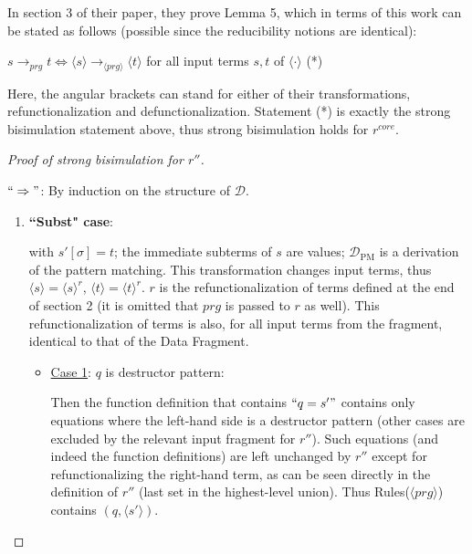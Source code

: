 In section 3 of their paper, they prove Lemma 5, which in terms of this work can be stated as follows (possible since the reducibility notions are identical):

$s \longrightarrow_{prg} t \iff \langle s \rangle \longrightarrow_{\langle prg \rangle} \langle t \rangle$ for all input terms $s,t$ of $\langle \cdot \rangle$ (*)

Here, the angular brackets can stand for either of their transformations, refunctionalization and defunctionalization. Statement (*) is exactly the strong bisimulation statement above, thus strong bisimulation holds for $r^{core}$.

\begin{proof}[Proof of strong bisimulation for $r''$] ~

$`` \Rightarrow "$: By induction on the structure of $\mathcal{D}$.

\begin{enumerate}
\item \textbf{``Subst" case}:

\begin{prooftree}
\end{prooftree}

with $s'[\sigma] = t$; the immediate subterms of $s$ are values; $\mathcal{D}_{\textrm{PM}}$ is a derivation of the pattern matching. This transformation changes input terms, thus $\langle s \rangle = \langle s \rangle^r$, $\langle t \rangle = \langle t \rangle^r$. $r$ is the refunctionalization of terms defined at the end of section 2 (it is omitted that $prg$ is passed to $r$ as well). This refunctionalization of terms is also, for all input terms from the fragment, identical to that of the Data Fragment.

\begin{itemize}

\item \underline{Case 1}: $q$ is destructor pattern:

Then the function definition that contains $`` q = s' "$ contains only equations where the left-hand side is a destructor pattern (other cases are excluded by the relevant input fragment for $r''$). Such equations (and indeed the function definitions) are left unchanged by $r''$ except for refunctionalizing the right-hand term, as can be seen directly in the definition of $r''$ (last set in the highest-level union). Thus Rules($\langle prg \rangle$) contains $(q, \langle s' \rangle)$.


\end{itemize}
\end{enumerate}
\end{proof}
